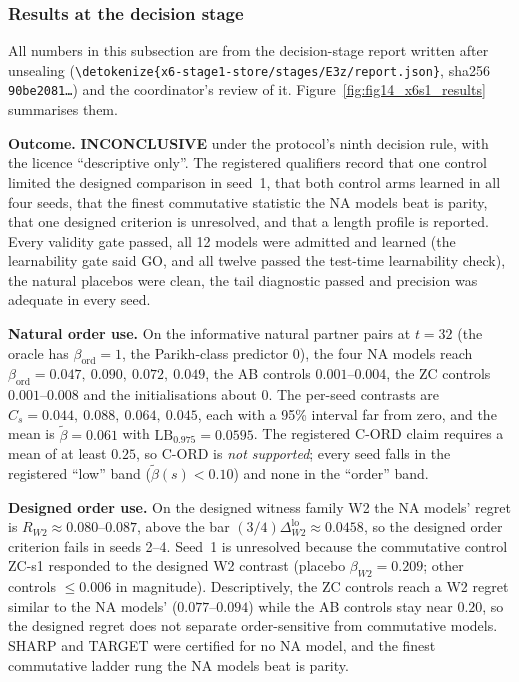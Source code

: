 \documentclass[11pt,a4paper]{article}
\DeclareRobustCommand{\_}{\ifmmode\origunderscore\else\textunderscore\allowbreak\fi}
\DeclareRobustCommand{\fpath}[1]{\begingroup\small\expandafter\nolinkurl\expandafter{\detokenize{#1}}\endgroup}
\begin{document}
\subsubsection{Results at the decision stage}\label{sec:x6s1results}
All numbers in this subsection are from the decision-stage report written after unsealing
(\fpath{x6-stage1-store/stages/E3z/report.json}, sha256 \texttt{90be2081\ldots}) and the
coordinator's review of it. Figure~\ref{fig:fig14_x6s1_results} summarises them.

\textbf{Outcome.} \textbf{INCONCLUSIVE} under the protocol's ninth decision rule, with the licence
``descriptive only''. The registered qualifiers record that one control limited the designed
comparison in seed~1, that both control arms learned in all four seeds, that the finest
commutative statistic the NA models beat is parity, that one designed criterion is unresolved,
and that a length profile is reported. Every validity gate passed, all 12 models were admitted
and learned (the learnability gate said GO, and all twelve passed the test-time learnability
check), the natural placebos were clean, the tail diagnostic passed and precision was adequate
in every seed.

\textbf{Natural order use.} On the informative natural partner pairs at $t=32$ (the oracle has
$\beta_{\mathrm{ord}}=1$, the Parikh-class predictor $0$), the four NA models reach
$\beta_{\mathrm{ord}}=0.047,\ 0.090,\ 0.072,\ 0.049$, the AB controls $0.001$--$0.004$, the ZC
controls $0.001$--$0.008$ and the initialisations about $0$. The per-seed contrasts are
$C_s=0.044,\ 0.088,\ 0.064,\ 0.045$, each with a 95\% interval far from zero, and the mean is
$\tilde\beta=0.061$ with $\mathrm{LB}_{0.975}=0.0595$. The registered C-ORD claim requires a mean of
at least $0.25$, so C-ORD is \emph{not supported}; every seed falls in the registered ``low''
band ($\tilde\beta(s)<0.10$) and none in the ``order'' band.

\textbf{Designed order use.} On the designed witness family W2 the NA models' regret is
$R_{W2}\approx0.080$--$0.087$, above the bar $(3/4)\Delta_{W2}^{\mathrm{lo}}\approx0.0458$, so
the designed order criterion fails in seeds 2--4. Seed~1 is unresolved because the commutative
control ZC-s1 responded
to the designed W2 contrast (placebo $\beta_{W2}=0.209$; other controls $\le0.006$ in magnitude).
Descriptively, the ZC controls reach a W2 regret similar to the NA models' ($0.077$--$0.094$)
while the AB controls stay near $0.20$, so the designed regret does not separate order-sensitive
from commutative models. SHARP and TARGET were certified for no NA model, and the finest
commutative ladder rung the NA models beat is parity.
\end{document}

